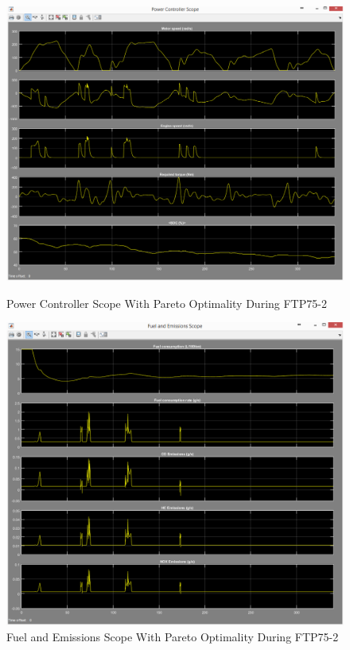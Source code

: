 \begin{figure}[hp]
\centering
\includegraphics[scale=0.44]{figures/Pareto/FTP75-2/powerController03Juli}
\caption{Power Controller Scope With Pareto Optimality During FTP75-2}
\label{fig:pcpo2}
\includegraphics[scale=0.47]{figures/Pareto/FTP75-2/fuelEmissions03Juli}
\caption{Fuel and Emissions Scope With Pareto Optimality During FTP75-2}
\label{fig:fepo2}
\end{figure}

